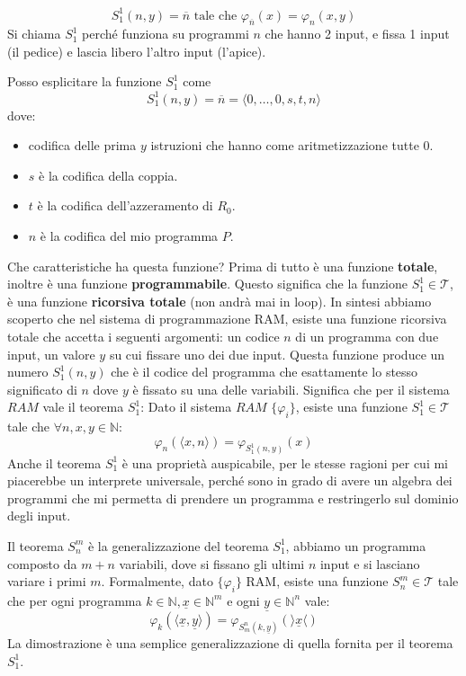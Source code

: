 \documentclass{article}
\begin{document}
\begin{enumerate}
          $$S_1^1(n,y)=\overline{n}\text{ tale che }\varphi_{\overline{n}}(x)=\varphi_n(x,y)$$
          Si chiama $S^1_1$ perché funziona su programmi $n$ che hanno 2 input, e fissa 1 input (il
          pedice) e lascia libero l'altro input (l'apice).

          Posso esplicitare la funzione $S_1^1$ come
          $$S_1^1(n,y)=\overline{n}=\langle 0,\dots,0,s,t,n\rangle$$
          dove:
          \begin{itemize}
              \item codifica delle prima $y$ istruzioni che hanno come aritmetizzazione tutte 0.
              \item $s$ è la codifica della coppia.
              \item $t$ è la codifica dell'azzeramento di $R_0$.
              \item $n$ è la codifica del mio programma $P$.
          \end{itemize}
          Che caratteristiche ha questa funzione? Prima di tutto è una funzione \textbf{totale}, inoltre
          è una funzione \textbf{programmabile}. Questo significa che la funzione $S_1^1\in\mathcal{T}$,
          è una funzione \textbf{ricorsiva totale} (non andrà mai in loop). In sintesi
          abbiamo scoperto che nel sistema di programmazione RAM, esiste una funzione ricorsiva totale che
          accetta i seguenti argomenti: un codice $n$ di un programma con due input, un valore $y$ su cui
          fissare uno dei due input. Questa funzione produce un numero $S_1^1(n,y)$ che è il codice del
          programma che esattamente lo stesso significato di $n$ dove $y$ è fissato su una delle variabili.
          Significa che per il sistema $RAM$ vale il teorema $S_1^1$: Dato il sistema $RAM$ $\{\varphi_i\}$,
          esiste una funzione $S_1^1\in\mathcal{T}$ tale che $\forall n,x,y\in\mathbb{N}$:
          $$\varphi_n\left(\langle x,n\rangle\right)=\varphi_{S_1^1(n,y)}(x)$$
          Anche il teorema $S_1^1$ è una proprietà auspicabile, per le stesse ragioni per cui mi piacerebbe
          un interprete universale, perché sono in grado di avere un algebra dei programmi che mi permetta di
          prendere un programma e restringerlo sul dominio degli input.

          Il teorema $S_n^m$ è la generalizzazione del teorema $S_1^1$, abbiamo un programma composto da
          $m+n$ variabili, dove si fissano gli ultimi $n$ input e si lasciano variare i primi $m$.
          Formalmente, dato $\{\varphi_i\}$ RAM, esiste una funzione $S_n^m\in\mathcal{T}$ tale che per
          ogni programma $k\in\mathbb{N},\underline{x}\in\mathbb{N}^m$ e ogni $\underline{y}\in\mathbb{N}^n$ vale:
          $$\varphi_k\left(\langle\underline{x},\underline{y}\rangle\right)=\varphi_{S_m^n(k,\underline{y})}\left(\rangle\underline{x}\langle\right)$$
          La dimostrazione è una semplice generalizzazione di quella fornita per il teorema $S_1^1$.
\end{enumerate}
\end{document}
